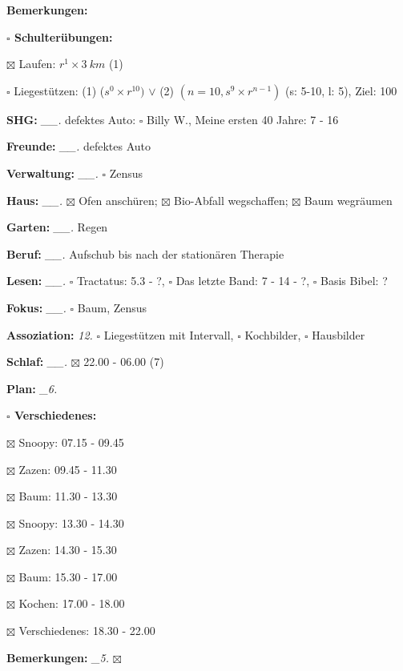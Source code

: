 \documentclass[10pt,a4paper]{article}
\newcommand\prop[1] {{\color {alizarin} {\bf #1}}}             %
\newcommand\mand[1] {{\color {burntorange} {\bf #1}}}          %
\newcommand\topspace{\vskip -15pt \hskip 20pt}
\newcommand\bottomspace{\vskip 4pt}
\newcommand\n[1] { {\sl #1.} \hskip 5pt }
\begin{document}
\begin{mdframed}[style=daystyle]
\begin{labeling}{{\mand {Bemerkungen:}}}
\begin{minipage}{0.75\textwidth}
\begin{labeling}{\prop {$\square$ {Schulterübungen:}}}
      \item[$\boxtimes$ Laufen:]          $r^1 \times 3\ km$ (1)
      \item[$\square$ Liegestützen:]    (1) ($s^0 \times r^{10})$ $\vee$ (2)
          $(n=10, s^9 \times r^{n-1})$ (s: 5-10, l: 5), Ziel: 100
      \end{labeling}
    \end{minipage}
    \bottomspace        
  \item[{\mand {SHG:}}]          \n{\_\_} defektes Auto: $\square$ Billy W., Meine ersten 40 Jahre: 7 - 16
  \item[{\mand {Freunde:}}]      \n{\_\_} defektes Auto
  \item[{\mand {Verwaltung:}}]   \n{\_\_} $\square$ Zensus
  \item[{\mand {Haus:}}]         \n{\_\_} $\boxtimes$ Ofen anschüren;
    $\boxtimes$ Bio-Abfall wegschaffen; $\boxtimes$ Baum wegräumen
  \item[{\mand {Garten:}}]       \n{\_\_} Regen
  \item[{\mand {Beruf:}}]        \n{\_\_} Aufschub bis nach der stationären Therapie
  \item[{\mand {Lesen:}}]        \n{\_\_} $\square$ Tractatus: 5.3 - ?,
      $\square$ Das letzte Band: 7 - 14 - ?, $\square$ Basis Bibel: ?
  \item[{\mand {Fokus:}}]        \n{\_\_} $\square$ Baum, Zensus
  \item[{\mand {Assoziation:}}]    \n{12} $\square$ Liegestützen mit Intervall,
    $\square$ Kochbilder, $\square$ Hausbilder
  \item[{\mand {Schlaf:}}]       \n{\_\_} $\boxtimes$ 22.00 - 06.00 (7)
  \item[{\mand {Plan:}}]          \n{\_6}
    \topspace
    \begin{minipage}{0.75\textwidth}  
      \begin{labeling}{\prop {$\square$ {Verschiedenes:}}} 
        \setlength\itemsep{-3pt}
      \item[$\boxtimes$ Snoopy:]  07.15 - 09.45
      \item[$\boxtimes$ Zazen:]   09.45 - 11.30
      \item[$\boxtimes$ Baum:]    11.30 - 13.30
      \item[$\boxtimes$ Snoopy:]  13.30 - 14.30
      \item[$\boxtimes$ Zazen:]   14.30 - 15.30
      \item[$\boxtimes$ Baum:]    15.30 - 17.00
      \item[$\boxtimes$ Kochen:]  17.00 - 18.00
      \item[$\boxtimes$ Verschiedenes:]  18.30 - 22.00
      \end{labeling}
    \end{minipage}
    \bottomspace
  \item[{\mand {Bemerkungen:}}]   \n{\_5} $\boxtimes$
  \end{labeling}
    

\end{mdframed}
\end{document}
